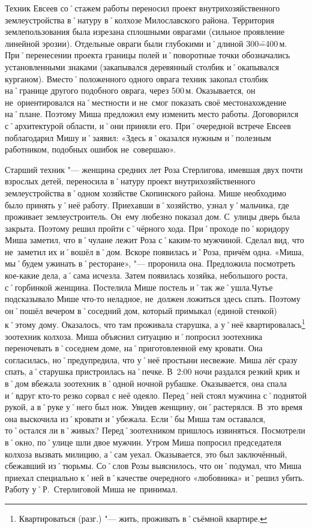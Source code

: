 Техник Евсеев со˚стажем работы переносил проект внутрихозяйственного землеустройства в˚натуру в˚колхозе Милославского района. Территория землепользования была изрезана сплошными оврагами (сильное проявление линейной эрозии). Отдельные овраги были глубокими и˚длиной 300\==400\,м. При˚перенесении проекта границы полей и˚поворотные точки обозначались установленными знаками (закапывался деревянный столбик и˚окапывался курганом). Вместо˚положенного одного оврага техник закопал столбик на˚границе другого подобного оврага, через 500\,м. Оказывается, он не~ориентировался на˚местности и не~смог показать своё местонахождение на˚плане. Поэтому Миша предложил ему изменить место работы. Договорился с˚архитектурой области, и˚они приняли его. При˚очередной встрече Евсеев поблагодарил Мишу и˚заявил: «Здесь я˚оказался нужным и˚полезным работником, подобных ошибок не~совершаю».

Старший техник "--- женщина средних лет Роза Стерлигова, имевшая двух почти взрослых детей, переносила в˚натуру проект внутрихозяйственного землеустройства в˚одном хозяйстве Скопинского района. Мише необходимо было принять у˚неё работу. Приехавши в˚хозяйство, узнал у˚мальчика, где проживает землеустроитель. Он~ему любезно показал дом. С~улицы дверь была закрыта. Поэтому решил пройти с˚чёрного хода. При˚проходе по˚коридору Миша заметил, что в˚чулане лежит Роза с˚каким-то мужчиной. Сделал вид, что не~заметил их и˚вошёл в˚дом. Вскоре появилась и˚Роза, причём одна. «Миша, мы˚будем ужинать в˚ресторане»,  "--- проронила она. Предложила посмотреть кое-какие дела, а˚сама исчезла. Затем появилась хозяйка, небольшого роста, с˚горбинкой женщина. Постелила Мише постель и˚так же˚ушла.Чутье подсказывало Мише что-то неладное, не~должен ложиться здесь спать. Поэтому он˚пошёл вечером в˚соседний дом, который примыкал (единой стенкой) к˚этому дому. Оказалось, что там проживала старушка, а у˚неё квартировалась\footnote{Квартироваться (разг.) "--- жить, проживать в˚съёмной квартире.} зоотехник колхоза. Миша объяснил  ситуацию и˚попросил зоотехника переночевать в˚соседнем доме, на˚приготовленной ему кровати. Она согласилась, но˚предупредила, что у˚неё простыни несвежие. Миша лёг сразу спать, а˚старушка пристроилась на˚печке. В~2:00 ночи раздался резкий крик и в˚дом вбежала зоотехник в˚одной ночной рубашке. Оказывается, она спала и˚вдруг кто-то резко сорвал с неё одеяло. Перед˚ней стоял мужчина с˚поднятой рукой, а в˚руке у˚него был нож. Увидев женщину, он˚растерялся. В~это время она выскочила из˚кровати и˚убежала. Если˚бы Миша там оставался, то˚остался ли в˚живых? Перед˚зоотехником пришлось извиняться. Посмотрели в˚окно, по˚улице шли двое мужчин. Утром Миша попросил председателя колхоза вызвать милицию, а˚сам уехал. Оказывается, это был заключённый, сбежавший из˚тюрьмы. Со˚слов Розы выяснилось, что он˚подумал, что Миша приехал специально к˚ней в˚качестве очередного «любовника» и˚решил убить. Работу у˚Р.~Стерлиговой Миша не~принимал.

